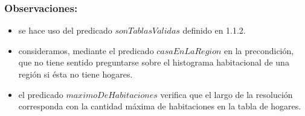     \subsubsection{Observaciones:}
        \begin{itemize}
            \item se hace uso del predicado $sonTablasValidas$ definido en 1.1.2.
            \item consideramos, mediante el predicado $casaEnLaRegion$ en la precondici\'on, que no tiene sentido preguntarse sobre el 
            histograma habitacional de una regi\'on si \'esta no tiene hogares.
            \item el predicado $maximoDeHabitaciones$ verifica que el largo de la resolución corresponda con la cantidad 
            máxima de habitaciones en la tabla de hogares.
        \end{itemize}

